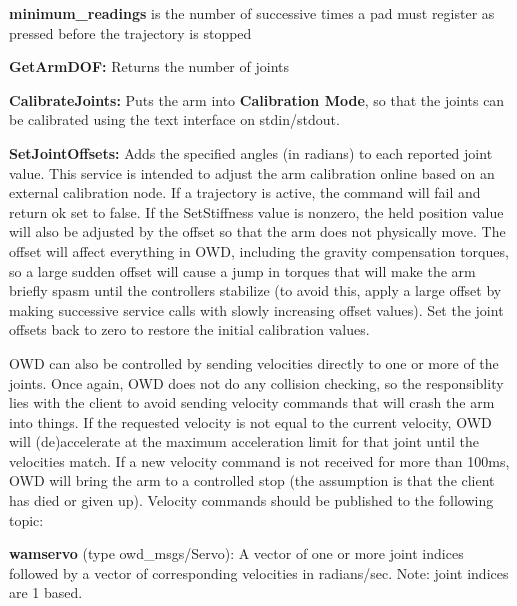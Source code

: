 \begin{DoxyItemize}
\begin{DoxyItemize}
\item {\bfseries minimum\-\_\-readings} is the number of successive times a pad must register as pressed before the trajectory is stopped
\end{DoxyItemize}
\item {\bfseries Get\-Arm\-D\-O\-F\-:} Returns the number of joints
\item {\bfseries Calibrate\-Joints\-:} Puts the arm into {\bfseries Calibration Mode}, so that the joints can be calibrated using the text interface on stdin/stdout.
\item {\bfseries Set\-Joint\-Offsets\-:} Adds the specified angles (in radians) to each reported joint value. This service is intended to adjust the arm calibration online based on an external calibration node. If a trajectory is active, the command will fail and return ok set to false. If the Set\-Stiffness value is nonzero, the held position value will also be adjusted by the offset so that the arm does not physically move. The offset will affect everything in O\-W\-D, including the gravity compensation torques, so a large sudden offset will cause a jump in torques that will make the arm briefly spasm until the controllers stabilize (to avoid this, apply a large offset by making successive service calls with slowly increasing offset values). Set the joint offsets back to zero to restore the initial calibration values.
\end{DoxyItemize}

O\-W\-D can also be controlled by sending velocities directly to one or more of the joints. Once again, O\-W\-D does not do any collision checking, so the responsiblity lies with the client to avoid sending velocity commands that will crash the arm into things. If the requested velocity is not equal to the current velocity, O\-W\-D will (de)accelerate at the maximum acceleration limit for that joint until the velocities match. If a new velocity command is not received for more than 100ms, O\-W\-D will bring the arm to a controlled stop (the assumption is that the client has died or given up). Velocity commands should be published to the following topic\-:


\begin{DoxyItemize}
\item {\bfseries wamservo} (type owd\-\_\-msgs/\-Servo)\-: A vector of one or more joint indices followed by a vector of corresponding velocities in radians/sec. Note\-: joint indices are 1 based.
\end{DoxyItemize}


